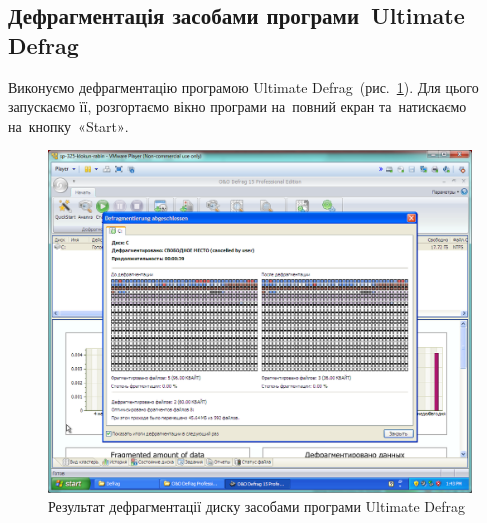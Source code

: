 \documentclass[
	a4paper,
	oneside,
	DIV = 12,
	fontsize = 13pt,
	headings = normal,
]{scrartcl}
\begin{document}
		\subsection{Дефрагментація засобами програми~\textenglish{Ultimate Defrag}}
			Виконуємо дефрагментацію програмою \textenglish{Ultimate Defrag}~(рис.~\ref{fig:06-ultimate-defrag}). Для цього запускаємо її, розгортаємо вікно програми на~повний екран та~натискаємо на~кнопку~\textenglish{«Start»}.
			\begin{figure}[!htbp]
				\centering
				\includegraphics[height = 8\baselineskip]{./assets/lab-02-07.png}
				\caption{Результат дефрагментації диску засобами програми \textenglish{Ultimate Defrag}}
				\label{fig:06-ultimate-defrag}
			\end{figure}
\end{document}
